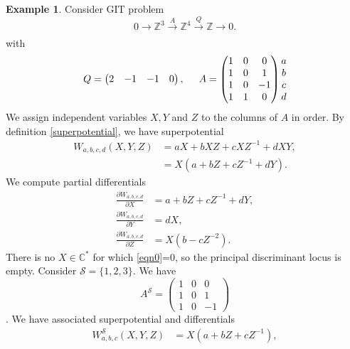 \documentclass[oneside,reqno]{amsart}
\theoremstyle{definition}
\theoremstyle{definition}
\theoremstyle{definition}
\newtheorem{example}{Example} [section]
\theoremstyle{definition}
\newcommand{\CC}{\mathbb{C}}
\newcommand{\Z}{\mathbb{Z}}
\begin{document}
\begin{example}
    \label{exmpdisc}
    \label{components}
    Consider GIT problem 
    $$
    0 \xrightarrow[]{} \Z^3 \xrightarrow[]{A} \Z^4 \xrightarrow[]{Q} \Z \xrightarrow[]{} 0.
    $$
    with
    $$
    Q = 
    \begin{pmatrix}
        2 & -1 & -1 & 0
    \end{pmatrix},
    \hspace{0.5cm}
    A =
    \begin{pmatrix}
        1 & 0 & 0 \\
        1 & 0 & 1 \\
        1 & 0 & -1 \\
        1 & 1 & 0
    \end{pmatrix}
    \begin{matrix}
        a \\
        b \\
        c \\
        d
    \end{matrix}
    $$
    We assign independent variables $X,Y$ and $Z$ to the columns of $A$ in order. By definition \eqref{superpotential}, we have superpotential
    \begin{align*}
    W_{a,b,c,d}(X,Y,Z) &= aX + b XZ + c X Z^{-1} + dXY,\\
                        & = X(a + bZ + c Z^{-1} + dY).
    \end{align*}
    We compute partial differentials
    \begin{align}
        \frac{\partial W_{a,b,c,d}}{\partial X} &= a + bZ +cZ^{-1} + dY, \\
        \label{eqn0}
        \frac{\partial W_{a,b,c,d}}{\partial Y} &=dX, \\
        \frac{\partial W_{a,b,c,d}}{\partial Z} &= X(b - cZ^{-2}).
    \end{align}
    There is no $X \in \CC^*$ for which \eqref{eqn0}=0, so the principal discriminant locus is empty. Consider $\mathcal{S} = \{1,2,3 \}$. We have 
    $$
    A^{\mathcal{S}} =
    \begin{pmatrix}
        1 & 0 & 0  \\
        1 & 0 & 1  \\
        1 & 0 & -1 
    \end{pmatrix}
    $$.
    We have associated superpotential and differentials
    \begin{align}
        W_{a,b,c}^{\mathcal{S}}(X,Y,Z)  &= X(a + bZ + c Z^{-1} ), 
        \nonumber \\

\end{align}
\end{example}
\end{document}
